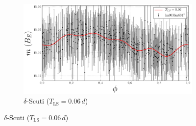 \begin{figure}[h]
\begin{subfigure}[t]{0.49\textwidth}
	\end{subfigure}
	\begin{subfigure}[t]{0.49\textwidth}
		\centering
		\caption{$\delta$-Scuti ($T_{\text{LS}} = 0.06 \, \unit{d}$)}
		\label{fig:lightcurve-dsct}
		\includegraphics[width=\textwidth]{figures/lightcurves/dsct.png}
	\end{subfigure}
\end{figure}
